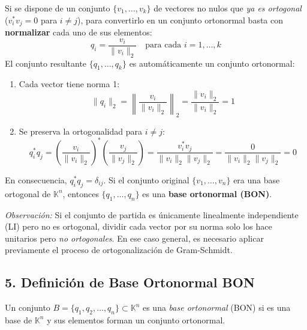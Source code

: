 \documentclass[11pt,a4paper]{article}
\begin{document}
Si se dispone de un conjunto $\{v_1, \dots, v_k\}$ de vectores no nulos que \emph{ya es ortogonal} ($v_i^* v_j = 0$ para $i \neq j$), para convertirlo en un conjunto ortonormal basta con \textbf{normalizar} cada uno de sus elementos:
\[
    q_i = \frac{v_i}{\|v_i\|_2} \quad \text{para cada } i = 1, \dots, k
    \]
    El conjunto resultante $\{q_1, \dots, q_k\}$ es automáticamente un conjunto ortonormal:
    \begin{enumerate}
        \item Cada vector tiene norma 1:
        \[
            \|q_i\|_2 = \left\| \frac{v_i}{\|v_i\|_2} \right\|_2 = \frac{\|v_i\|_2}{\|v_i\|_2} = 1
            \]
            \item Se preserva la ortogonalidad para $i \neq j$:
            \[
                q_i^* q_j = \left( \frac{v_i}{\|v_i\|_2} \right)^* \left( \frac{v_j}{\|v_j\|_2} \right) = \frac{v_i^* v_j}{\|v_i\|_2 \|v_j\|_2} = \frac{0}{\|v_i\|_2 \|v_j\|_2} = 0
                \]
            \end{enumerate}
            En consecuencia, $q_i^* q_j = \delta_{ij}$. Si el conjunto original $\{v_1, \dots, v_n\}$ era una base ortogonal de $\mathbb{K}^n$, entonces $\{q_1, \dots, q_n\}$ es una \textbf{base ortonormal (BON)}.
            
\vspace{0.4em}
\noindent
\emph{Observación:} Si el conjunto de partida es únicamente linealmente independiente (LI) pero no es ortogonal, dividir cada vector por su norma solo los hace unitarios pero \emph{no ortogonales}. En ese caso general, es necesario aplicar previamente el proceso de ortogonalización de Gram-Schmidt.

\subsection*{5. Definición de Base Ortonormal BON}

Un conjunto $B = \{q_1, q_2, \dots, q_n\} \subset \mathbb{K}^n$ es una \emph{base ortonormal} (BON) si es una base de $\mathbb{K}^n$ y sus elementos forman un conjunto ortonormal.


\end{document}
